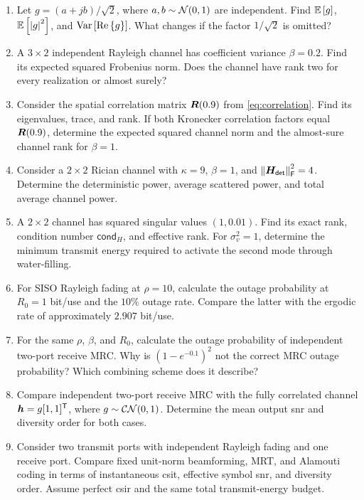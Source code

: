 \begin{enumerate}[label=\textbf{E\arabic*.}]
	
	\item Let $g=(a+jb)/\sqrt{2}$, where $a,b\sim\mathcal{N}(0,1)$ are independent. Find $\mathbb{E}\left[g\right]$, $\mathbb{E}\left[\left|g\right|^2\right]$, and $\operatorname{Var}\left[\operatorname{Re}\left\{g\right\}\right]$. What changes if the factor $1/\sqrt{2}$ is omitted?
	
	\item A $3\times2$ independent Rayleigh channel has coefficient variance $\beta=0.2$. Find its expected squared Frobenius norm. Does the channel have rank two for every realization or almost surely?
	
	\item Consider the spatial correlation matrix $\bm{R}(0.9)$ from \eqref{eq:correlation}. Find its eigenvalues, trace, and rank. If both Kronecker correlation factors equal $\bm{R}(0.9)$, determine the expected squared channel norm and the almost-sure channel rank for $\beta=1$.
	
	\item Consider a $2\times2$ Rician channel with $\kappa=9$, $\beta=1$, and $\left\|\bm{H}_{\mathsf{det}}\right\|_{\mathsf{F}}^2=4$. Determine the deterministic power, average scattered power, and total average channel power.
	
	\item A $2\times2$ channel has squared singular values $(1,0.01)$. Find its exact rank, condition number $\mathsf{cond}_{H}$, and effective rank. For $\sigma_v^2=1$, determine the minimum transmit energy required to activate the second mode through water-filling.
	
	\item For SISO Rayleigh fading at $\rho=10$, calculate the outage probability at $R_0=1$ bit/use and the $10\%$ outage rate. Compare the latter with the ergodic rate of approximately $2.907$ bit/use.
	
	\item For the same $\rho$, $\beta$, and $R_0$, calculate the outage probability of independent two-port receive MRC. Why is $(1-e^{-0.1})^2$ not the correct MRC outage probability? Which combining scheme does it describe?
	
	\item Compare independent two-port receive MRC with the fully correlated channel $\bm{h}=g[1,1]^{\mathsf T}$, where $g\sim\mathcal{CN}(0,1)$. Determine the mean output \ac{snr} and diversity order for both cases.
	
	\item Consider two transmit ports with independent Rayleigh fading and one receive port. Compare fixed unit-norm beamforming, MRT, and Alamouti coding in terms of instantaneous \ac{csit}, effective symbol \ac{snr}, and diversity order. Assume perfect \ac{csir} and the same total transmit-energy budget.
	

\end{enumerate}
